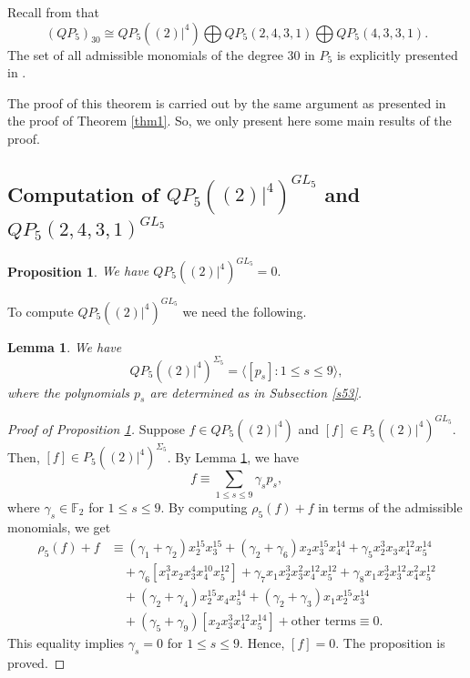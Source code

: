 \documentclass[reqno]{amsart}
\theoremstyle{plain}
\theoremstyle{definition}
\theoremstyle{plain}
\newtheorem{props}[thms]{Proposition}
\newtheorem{lems}[thms]{Lemma}
\theoremstyle{definition}
\numberwithin{equation}{section}
\begin{document}
Recall from \cite{suz} that
$$
(QP_5)_{30}	\cong QP_5((2)|^4) \bigoplus QP_5(2,4,3,1) \bigoplus QP_5(4,3,3,1).
$$ 
The set of all admissible monomials of the degree 30 in $P_5$ is explicitly presented in \cite{smo}.

The proof of this theorem is carried out by the same argument as presented in the proof of Theorem \ref{thm1}. So, we only present here some main results of the proof. 

\subsection{Computation of $QP_5((2)|^4)^{GL_5}$ and $QP_5(2,4,3,1)^{GL_5}$}

\begin{props}\label{mdt31} We have 
$QP_5((2)|^4)^{GL_5} = 0.$
\end{props}

To compute $QP_5((2)|^4)^{GL_5}$ we need the following.

\begin{lems}\label{bdt31} We have 
$$QP_5((2)|^4)^{\Sigma_5} = \langle [p_s]: 1 \leqslant s \leqslant 9\rangle, $$
where the polynomials $p_s$ are determined as in Subsection \ref{s53}.
\end{lems}

\begin{proof}[Proof of Proposition \ref{mdt31}] Suppose $f \in QP_5((2)|^4)$ and $[f] \in P_5((2)|^4)^{GL_5}$. Then, $[f] \in P_5((2)|^4)^{\Sigma_5}$. By Lemma \ref{bdt31}, we have 
$$ f \equiv \sum_{1 \leqslant s \leqslant 9}\gamma_sp_s,$$
where $\gamma_s \in \mathbb F_2$ for $1 \leqslant s \leqslant 9$. By computing $\rho_5(f)+f$ in terms of the admissible monomials, we get
\begin{align*}
\rho_5(f)+f &\equiv (\gamma_1 + \gamma_2)x_2^{15}x_3^{15} + (\gamma_2+\gamma_6)x_2x_3^{15}x_4^{14} + \gamma_5x_2^3x_3x_4^{12}x_5^{14} \\ &\quad + \gamma_6[x_1^3x_2x_3^4x_4^{10}x_5^{12}] +
\gamma_7x_1x_2^3x_3^2x_4^{12}x_5^{12} +
\gamma_8x_1x_2^3x_3^{12}x_4^{2}x_5^{12}\\ &\quad +
(\gamma_2+\gamma_4)x_2^{15}x_4x_5^{14} + 
(\gamma_2+\gamma_3)x_1x_2^{15}x_3^{14}\\ &\quad  + 
(\gamma_5+\gamma_9)[x_2x_3^3x_4^{12}x_5^{14}] + \mbox{other terms} \equiv 0.
\end{align*}
This equality implies $\gamma_s = 0$ for $1 \leqslant s \leqslant 9$. Hence, $[f] = 0$. The proposition is proved.
\end{proof}
\end{document}
